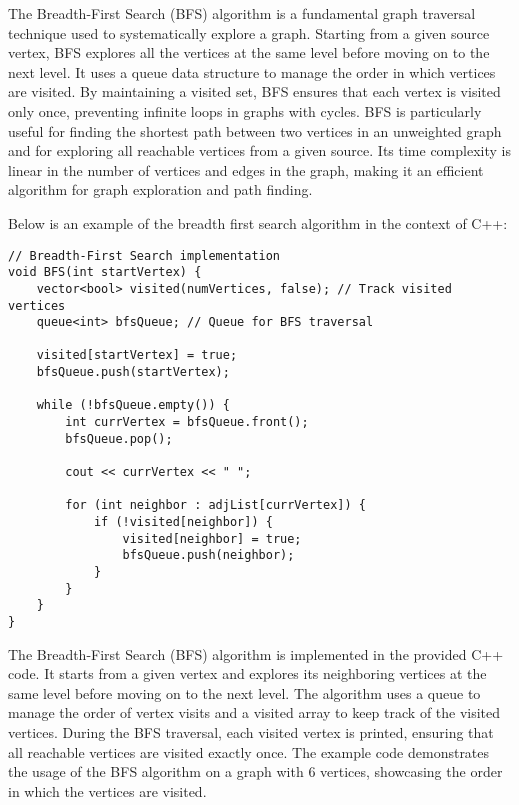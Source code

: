 The Breadth-First Search (BFS) algorithm is a fundamental graph traversal technique used to systematically explore a graph. Starting from a given source vertex, BFS explores all the vertices at the same level before moving on to 
the next level. It uses a queue data structure to manage the order in which vertices are visited. By maintaining a visited set, BFS ensures that each vertex is visited only once, preventing infinite loops in graphs with cycles. 
BFS is particularly useful for finding the shortest path between two vertices in an unweighted graph and for exploring all reachable vertices from a given source. Its time complexity is linear in the number of vertices and edges 
in the graph, making it an efficient algorithm for graph exploration and path finding.

\begin{solution}

Below is an example of the breadth first search algorithm in the context of C++:

\horizontalline

\begin{verbatim}
// Breadth-First Search implementation
void BFS(int startVertex) {
    vector<bool> visited(numVertices, false); // Track visited vertices
    queue<int> bfsQueue; // Queue for BFS traversal

    visited[startVertex] = true;
    bfsQueue.push(startVertex);

    while (!bfsQueue.empty()) {
        int currVertex = bfsQueue.front();
        bfsQueue.pop();

        cout << currVertex << " ";

        for (int neighbor : adjList[currVertex]) {
            if (!visited[neighbor]) {
                visited[neighbor] = true;
                bfsQueue.push(neighbor);
            }
        }
    }
}
\end{verbatim}

\horizontalline

\noindent The Breadth-First Search (BFS) algorithm is implemented in the provided C++ code. It starts from a given vertex and explores its neighboring vertices at the same level before moving on to the next level. The algorithm uses 
a queue to manage the order of vertex visits and a visited array to keep track of the visited vertices. During the BFS traversal, each visited vertex is printed, ensuring that all reachable vertices are visited exactly once. The example 
code demonstrates the usage of the BFS algorithm on a graph with 6 vertices, showcasing the order in which the vertices are visited.
    
\end{solution}

